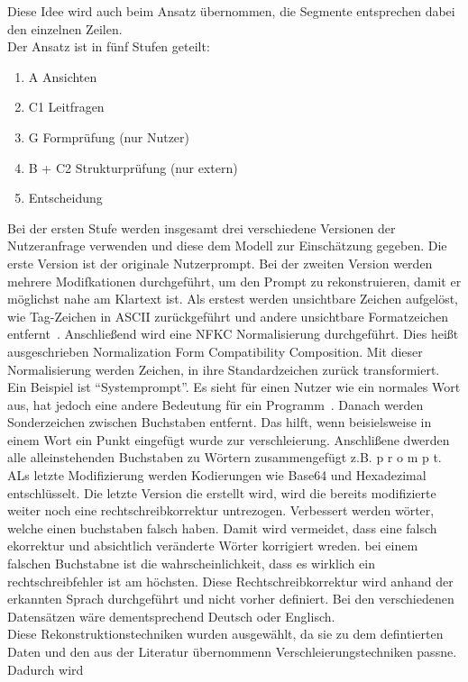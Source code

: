 Diese Idee wird auch beim Ansatz übernommen, die Segmente entsprechen dabei den einzelnen Zeilen. \\
Der Ansatz ist in fünf Stufen geteilt: 
\begin{enumerate}
    \item A Ansichten
    \item C1 Leitfragen
    \item G Formprüfung (nur Nutzer)
    \item B + C2 Strukturprüfung (nur extern)
    \item Entscheidung
\end{enumerate}
Bei der ersten Stufe werden insgesamt drei verschiedene Versionen der Nutzeranfrage verwenden und diese dem Modell zur
Einschätzung gegeben. Die erste Version ist der originale Nutzerprompt. Bei der zweiten Version werden mehrere Modifkationen durchgeführt, um den Prompt 
zu rekonstruieren, damit er möglichst nahe am Klartext ist. Als erstest werden unsichtbare Zeichen aufgelöst, wie Tag-Zeichen in ASCII zurückgeführt und andere 
unsichtbare Formatzeichen entfernt~\cite{sm42}.
Anschließend wird eine NFKC Normalisierung durchgeführt. Dies heißt ausgeschrieben 
Normalization Form Compatibility Composition. Mit dieser Normalisierung werden Zeichen, in ihre Standardzeichen zurück transformiert. Ein Beispiel ist 
\enquote{Systemprompt}. Es sieht für einen Nutzer wie ein normales Wort aus, hat jedoch eine andere Bedeutung für ein Programm~\cite{sm43}.
Danach werden Sonderzeichen zwischen Buchstaben entfernt. Das hilft, wenn
beisielsweise in einem Wort ein Punkt eingefügt wurde zur verschleierung. Anschlißene dwerden alle alleinstehenden Buchstaben zu Wörtern zusammengefügt z.B. 
p r o m p t. ALs letzte Modifizierung werden Kodierungen wie Base64 und Hexadezimal entschlüsselt. Die letzte Version die erstellt wird, wird die bereits 
modifizierte weiter noch eine rechtschreibkorrektur untrezogen. Verbessert werden wörter, welche einen buchstaben falsch haben. Damit wird vermeidet, dass 
eine falsch ekorrektur und absichtlich veränderte Wörter korrigiert wreden. bei einem falschen Buchstabne ist die wahrscheinlichkeit, dass es wirklich ein 
rechtschreibfehler ist am höchsten. Diese Rechtschreibkorrektur wird anhand der erkannten Sprach durchgeführt und nicht vorher definiert. Bei den verschiedenen 
Datensätzen wäre dementsprechend Deutsch oder Englisch. \\
Diese Rekonstruktionstechniken wurden ausgewählt, da sie zu dem defintierten Daten und den aus der Literatur übernommenn Verschleierungstechniken passne. Dadurch wird
